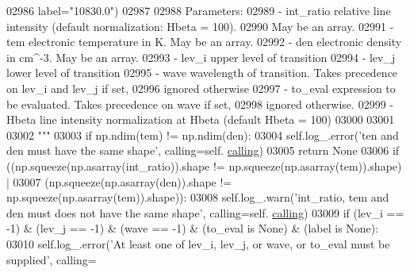 \begin{DoxyCode}
{{{{{{{{{{{{{{{{{{{{{{02986 \textcolor{stringliteral}{                label="10830.0")}
02987 \textcolor{stringliteral}{            }
02988 \textcolor{stringliteral}{        Parameters:}
02989 \textcolor{stringliteral}{            - int\_ratio    relative line intensity (default normalization: Hbeta = 100). }
02990 \textcolor{stringliteral}{                            May be an array.}
02991 \textcolor{stringliteral}{            - tem          electronic temperature in K. May be an array.}
02992 \textcolor{stringliteral}{            - den          electronic density in cm^-3. May be an array.}
02993 \textcolor{stringliteral}{            - lev\_i        upper level of transition}
02994 \textcolor{stringliteral}{            - lev\_j        lower level of transition}
02995 \textcolor{stringliteral}{            - wave         wavelength of transition. Takes precedence on lev\_i and lev\_j if set, }
02996 \textcolor{stringliteral}{                            ignored otherwise }
02997 \textcolor{stringliteral}{            - to\_eval      expression to be evaluated. Takes precedence on wave if set, }
02998 \textcolor{stringliteral}{                            ignored otherwise.}
02999 \textcolor{stringliteral}{            - Hbeta        line intensity normalization at Hbeta (default Hbeta = 100)}
03000 \textcolor{stringliteral}{}
03001 \textcolor{stringliteral}{        }
03002 \textcolor{stringliteral}{        """}
03003         \textcolor{keywordflow}{if} np.ndim(tem) != np.ndim(den):
03004             self.log\_.error(\textcolor{stringliteral}{'ten and den must have the same shape'}, calling=self.
      \hyperlink{classpyneb_1_1core_1_1pynebcore_1_1_rec_atom_a82ec425ebba32b73a5d9ae52717d47c4}{calling})
03005             \textcolor{keywordflow}{return} \textcolor{keywordtype}{None}
03006         \textcolor{keywordflow}{if} ((np.squeeze(np.asarray(int\_ratio)).shape != np.squeeze(np.asarray(tem)).shape) | 
03007             (np.squeeze(np.asarray(den)).shape != np.squeeze(np.asarray(tem)).shape)):
03008             self.log\_.warn(\textcolor{stringliteral}{'int\_ratio, tem and den must does not have the same shape'}, calling=self.
      \hyperlink{classpyneb_1_1core_1_1pynebcore_1_1_rec_atom_a82ec425ebba32b73a5d9ae52717d47c4}{calling})
03009         \textcolor{keywordflow}{if} (lev\_i == -1) & (lev\_j == -1) & (wave == -1) & (to\_eval \textcolor{keywordflow}{is} \textcolor{keywordtype}{None}) & (label \textcolor{keywordflow}{is} \textcolor{keywordtype}{None}):
03010             self.log\_.error(\textcolor{stringliteral}{'At least one of lev\_i, lev\_j, or wave, or to\_eval must be supplied'}, calling=
}}}}}}}}}}}}}}}}}}}}}}
\end{DoxyCode}
